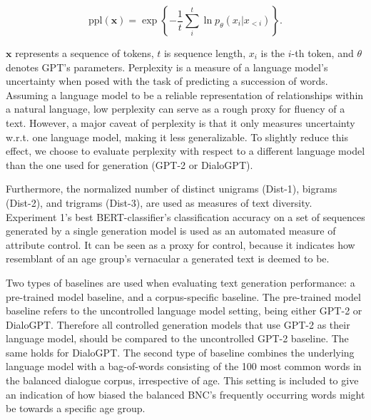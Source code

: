 \begin{equation}
    \text{ppl}(\textbf{x}) = \exp \left\{ - \frac{1}{t} \sum_{i}^t \ln p_{\theta}(x_i | x_{<i})\right\}.    
\end{equation}

$\textbf{x}$ represents a sequence of tokens, $t$ is sequence length, $x_i$ is the $i$-th token, and $\theta$ denotes GPT's parameters. Perplexity is a measure of a language model's uncertainty when posed with the task of predicting a succession of words. Assuming a language model to be a reliable representation of relationships within a natural language, low perplexity can serve as a rough proxy for fluency of a text. However, a major caveat of perplexity is that it only measures uncertainty w.r.t. one language model, making it less generalizable. To slightly reduce this effect, we choose to evaluate perplexity with respect to a different language model than the one used for generation (GPT-2 or DialoGPT).

Furthermore, the normalized number of distinct unigrams (Dist-1), bigrams (Dist-2), and trigrams (Dist-3), are used as measures of text diversity. Experiment 1's best BERT-classifier's classification accuracy on a set of sequences generated by a single generation model is used as an automated measure of attribute control. It can be seen as a proxy for control, because it indicates how resemblant of an age group's vernacular a generated text is deemed to be.

Two types of baselines are used when evaluating text generation performance: a pre-trained model baseline, and a corpus-specific baseline. The pre-trained model baseline refers to the uncontrolled language model setting, being either GPT-2 or DialoGPT. Therefore all controlled generation models that use GPT-2 as their language model, should be compared to the uncontrolled GPT-2 baseline. The same holds for DialoGPT. The second type of baseline combines the underlying language model with a bag-of-words consisting of the 100 most common words in the balanced dialogue corpus, irrespective of age. This setting is included to give an indication of how biased the balanced BNC's frequently occurring words might be towards a specific age group.




